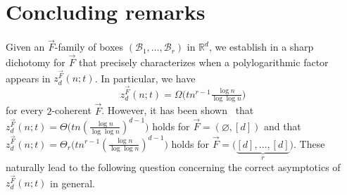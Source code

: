 \documentclass[11pt]{article}
\theoremstyle{definition}
\newcommand*{\eqdef}{\stackrel{\mbox{\normalfont\tiny def}}{=}} %
\newcommand*{\R}{\mathbb{R}}                                    %
\newcommand*{\cH}{\mathcal{H}}
\newcommand*{\vF}{\vec{F}}
\newcommand*{\cB}{\mathcal{B}}
\newcommand*{\vn}{\vec{n}}
\begin{document}
    

\section{Concluding remarks} \label{sec:remark}

Given an $\vF$-family of boxes $(\cB_1, \dots, \cB_r)$ in $\R^d$, we establish in  a sharp dichotomy for $\vF$ that precisely characterizes when a polylogarithmic factor appears in $z_d^{\vF}(n; t)$. In particular, we have
\[
z_d^{\vF}(n; t) = \Omega \bigl( t n^{r-1} \tfrac{\log n}{\log\log n} \bigr)
\]
for every $2$-coherent $\vF$. However, it has been shown~\cite{chan_har-peled,chan_keller_smorodinsky} that $z_d^{\vF}(n; t) = \Theta \bigl( tn (\tfrac{\log n}{ \log\log n})^{d-1} \bigr)$ holds for $\vF = (\varnothing, [d])$ and that $z_d^{\vF}(n; t) = \Theta_r \bigl( tn^{r-1} (\tfrac{\log n}{ \log\log n})^{d-1} \bigr)$ holds for $\vF = \bigl( \underbrace{[d], \dots, [d]}_r \bigr)$. These naturally lead to the following question concerning the correct asymptotics of $z_d^{\vF}(n; t)$ in general. 
\end{document}
